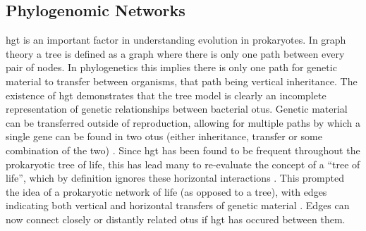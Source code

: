 \subsection{Phylogenomic Networks}
\ac{hgt} is an important factor in understanding evolution in prokaryotes.
In graph theory a tree is defined as a graph where there is only one path between every pair of nodes.
In phylogenetics this implies there is only one path for genetic material to transfer between organisms, that path being vertical inheritance.
The existence of \ac{hgt} demonstrates that the tree model is clearly an incomplete representation of genetic relationships between bacterial \ac{otu}s.
Genetic material can be transferred outside of reproduction, allowing for multiple paths by which a single gene can be found in two \ac{otu}s (either inheritance, transfer or some combination of the two) \citep{lgt}.
Since \ac{hgt} has been found to be frequent throughout the prokaryotic tree of life, this has lead many to re-evaluate the concept of a ``tree of life'', which by definition ignores these horizontal interactions \citep{netoflife}.
This prompted the idea of a prokaryotic network of life (as opposed to a tree), with edges indicating both vertical and horizontal transfers of genetic material \citep{netoflife}.
Edges can now connect closely or distantly related \ac{otu}s if \ac{hgt} has occured between them.
